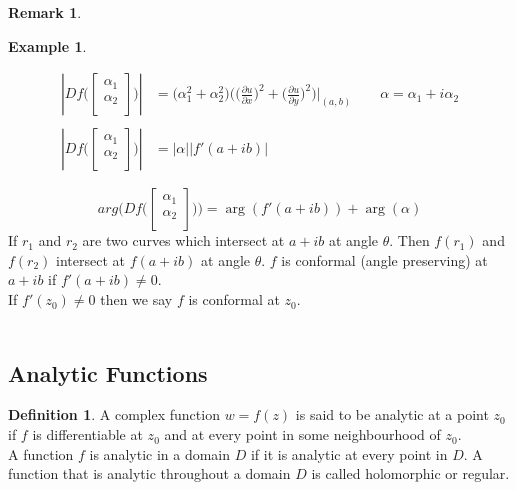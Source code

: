 \documentclass[11pt,a4paper]{article}
\theoremstyle{definition}
\newtheorem{definition}[thm]{Definition}
\newtheorem{example}[thm]{Example}
\newtheorem{remark}[thm]{Remark}
\begin{document}
\begin{remark}
\begin{example}
\begin{enumerate}
\begin{align*}
\left|Df\Bigg(\begin{bmatrix} \alpha_1\\ \alpha_2\\ \end{bmatrix}\Bigg)\right| & = \Big(\alpha^2_1 + \alpha_2^2\Big)\Bigg(\Big(\frac{\partial u}{\partial x}\Big)^2 + \Big(\frac{\partial u}{\partial y}\Big)^2\Bigg)\Bigg|_{(a,b)}\qquad  \alpha = \alpha_1 + i\alpha_2\\\\
\left|Df\Bigg(\begin{bmatrix} \alpha_1\\ \alpha_2\\ \end{bmatrix}\Bigg)\right| & = \left|\alpha\right|\left|f'(a + ib)\right|
\end{align*}


$$arg\Bigg(Df\Bigg(\begin{bmatrix}
\alpha_1\\
\alpha_2\\
\end{bmatrix}\Bigg)\Bigg) = \operatorname{arg}(f'(a + ib)) + \operatorname{arg} (\alpha)$$
If $r_1$ and $r_2$ are two curves which intersect at $a + ib$ at angle $\theta$. Then $f(r_1)$ and $f(r_2)$ intersect at $f(a  + ib)$ at angle $\theta$. $f$ is conformal (angle preserving) at $a+ ib$ if $f'(a + ib) \neq 0$.\\
If $f'(z_0) \neq 0$ then we say $f$ is conformal at $z_0$.\\\\
\end{enumerate}
\end{example}
\end{remark}

{\color[wave]{485}\subsection{Analytic Functions}}
\begin{definition}
A complex function $w = f(z)$ is said to be analytic at a  point $z_0$ if $f$ is differentiable at $z_0$ and at every point in some neighbourhood of $z_0$.\\

A function $f$ is analytic in a domain $D$ if it is analytic at every point in $D$. A function that is analytic throughout a domain $D$ is called holomorphic or regular.
\end{definition}
\end{document}
